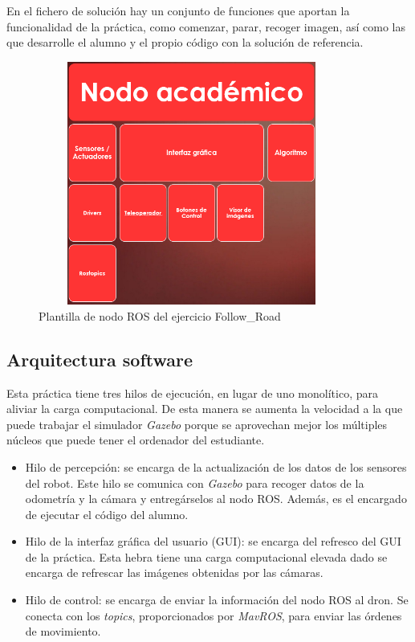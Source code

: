 En el fichero de solución hay un conjunto de funciones que aportan la funcionalidad de la práctica, como comenzar, parar, recoger imagen, así como las que desarrolle el alumno y el propio código con la solución de referencia.

\begin{figure}[H]
  \begin{center}
    \includegraphics[width=0.9\textwidth, height=8cm]{figures/na_fr.png}
		\caption{Plantilla de nodo ROS del ejercicio Follow\_Road}
		\label{fig.na_fr}
		\end{center}
\end{figure} 

\subsection{Arquitectura software}
Esta práctica tiene tres hilos de ejecución, en lugar de uno monolítico, para aliviar la carga computacional. De esta manera se aumenta la velocidad a la que puede trabajar el simulador \textit{Gazebo} porque se aprovechan mejor los múltiples núcleos que puede tener el ordenador del estudiante.

\begin{itemize}
	\item Hilo de percepción: se encarga de la actualización de los datos de los sensores del robot. Este hilo se comunica con \textit{Gazebo} para recoger datos de la odometría y la cámara y entregárselos al nodo ROS. Además, es el encargado de ejecutar el código del alumno.
	\item Hilo de la interfaz gráfica del usuario (GUI): se encarga del refresco del GUI de la práctica. Esta hebra tiene una carga computacional elevada dado se encarga de refrescar las imágenes obtenidas por las cámaras.
	\item Hilo de control: se encarga de enviar la información del nodo ROS al dron. Se conecta con los \textit{topics}, proporcionados por \textit{MavROS}, para enviar las órdenes de movimiento.
\end{itemize}

